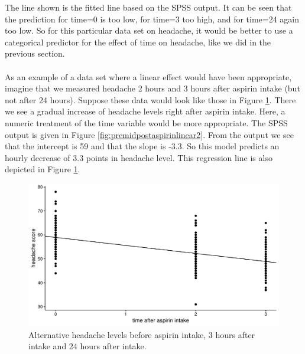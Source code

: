 \documentclass[]{book}\usepackage[]{graphicx}\usepackage[]{color}
\makeatletter
\def\maxwidth{ %
  \ifdim\Gin@nat@width>\linewidth
    \linewidth
  \else
    \Gin@nat@width
  \fi
}
\newenvironment{knitrout}{}{} %
\makeatother
\begin{document}
The line shown is the fitted line based on the SPSS output. It can be seen that the prediction for time=0 is too low, for time=3 too high, and for time=24 again too low. So for this particular data set on headache, it would be better to use a categorical predictor for the effect of time on headache, like we did in the previous section.
\\
\\
As an example of a data set where a linear effect would have been appropriate, imagine that we measured headache 2 hours and 3 hours after aspirin intake (but not after 24 hours). Suppose these data would look like those in Figure \ref{fig:analysispremidpost6}. There we see a gradual increase of headache levels right after aspirin intake. Here, a numeric treatment of the time variable would be more appropriate. The SPSS output is given in Figure \ref{fig:premidpostaspirinlinear2}. From the output we see that the intercept is 59 and that the slope is -3.3. So this model predicts an hourly decrease of 3.3 points in headache level. This regression line is also depicted in Figure \ref{fig:analysispremidpost6}. 




\begin{knitrout}
\color{fgcolor}\begin{figure}

{\centering \includegraphics[width=\maxwidth]{figure/analysispremidpost6-1} 

}

\caption[Alternative headache levels before aspirin intake, 3 hours after intake and 24 hours after intake]{Alternative headache levels before aspirin intake, 3 hours after intake and 24 hours after intake.}\label{fig:analysispremidpost6}
\end{figure}


\end{knitrout}
\end{document}
